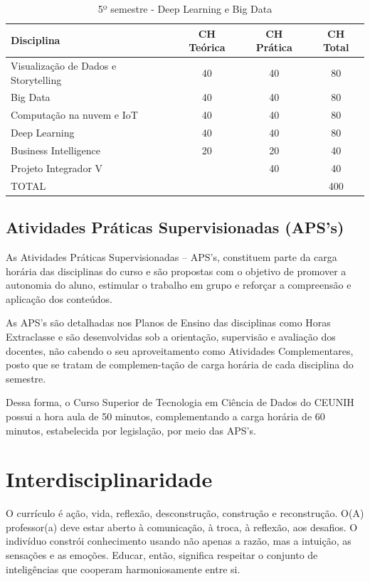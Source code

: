 \documentclass[a4paper, 12pt, openright, oneside, german, french, english, brazil]{abntex2}
\begin{document}
\begin{table}[!h]
  \centering
  \footnotesize
  \caption{5º semestre - Deep Learning e Big Data}
  \label{5sem}
  \begin{tabular}{|p{6cm}|c|c|c|}
    \hline
    \textbf{Disciplina} & CH Teórica & CH Prática & CH Total \\
    \hline
    Visualização de Dados e Storytelling & 40 & 40 & 80 \\
    \hline
    Big Data & 40 & 40 & 80 \\
    \hline
    Computação na nuvem e IoT & 40 & 40 & 80 \\
    \hline
    Deep Learning & 40 & 40 & 80 \\
    \hline
    Business Intelligence & 20 & 20 & 40 \\
    \hline
    Projeto Integrador V & & 40 & 40 \\
    \hline
    TOTAL & & & 400 \\
    \hline
  \end{tabular}
\end{table}

\newpage

\section{Atividades Práticas Supervisionadas (APS's)}

As Atividades Práticas Supervisionadas – APS's, constituem parte da carga horária das disciplinas do curso e são propostas com o objetivo de promover a autonomia do aluno, estimular o trabalho em grupo e reforçar a compreensão e aplicação dos conteúdos.

As APS's são detalhadas nos Planos de Ensino das disciplinas como Horas Extraclasse e são desenvolvidas sob a orientação, supervisão e avaliação dos docentes, não cabendo o seu aproveitamento como Atividades Complementares, posto que se tratam de complemen-tação de carga horária de cada disciplina do semestre.

Dessa forma, o Curso Superior de Tecnologia em Ciência de Dados do CEUNIH possui a hora aula de 50 minutos, complementando a carga horária de 60 minutos, estabelecida por legislação, por meio das APS's.

\chapter{Interdisciplinaridade}

O currículo é ação, vida, reflexão, desconstrução, construção e reconstrução. O(A) professor(a) deve estar aberto à comunicação, à troca, à reflexão, aos desafios. O indivíduo constrói conhecimento usando não apenas a razão, mas a intuição, as sensações e as emoções. Educar, então, significa respeitar o conjunto de inteligências que cooperam harmoniosamente entre si.
\end{document}
